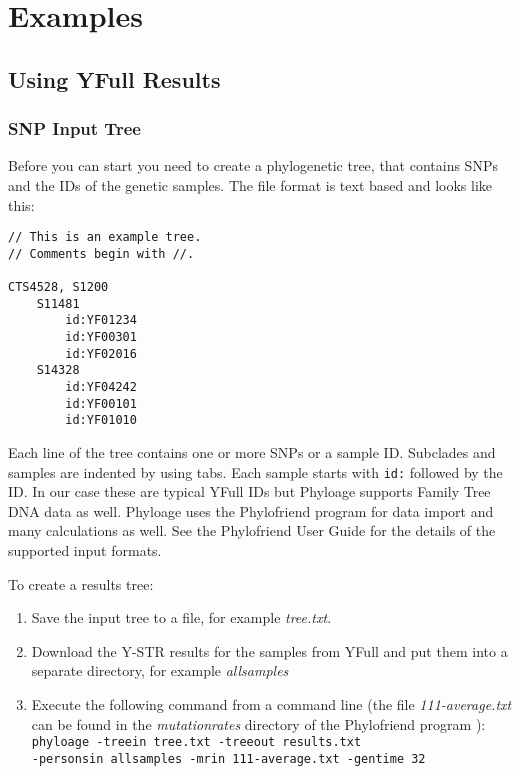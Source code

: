 \section{Examples}

\subsection{Using YFull Results}

\subsubsection*{SNP Input Tree}

Before you can start you need to create a phylogenetic tree,
that contains SNPs and the IDs of the genetic samples. The
file format is text based and looks like this:

\begin{verbatim}
// This is an example tree.
// Comments begin with //.

CTS4528, S1200
    S11481
        id:YF01234
        id:YF00301
        id:YF02016
    S14328
        id:YF04242
        id:YF00101
        id:YF01010
\end{verbatim}

Each line of the tree contains one or more SNPs or a sample
ID. Subclades and samples are indented by using tabs. Each
sample starts with \texttt{id:} followed by the ID. In our case
these are typical YFull IDs but Phyloage supports Family Tree
DNA data as well. Phyloage uses the Phylofriend
\cite{Phylofriend} program for data import and many
calculations as well. See the Phylofriend User Guide
\cite{PhylofriendUserGuide} for the details of the supported
input formats.

To create a results tree:

\begin{enumerate}
\item Save the input tree to a file, for example \emph{tree.txt}.
\item Download the Y-STR results for the samples from YFull
    and put them into a separate directory, for example
    \emph{allsamples}
\item Execute the following command from a command line
    (the file \emph{111-average.txt} can be found in the
    \emph{mutationrates} directory of the Phylofriend program
    \cite{Phylofriend}):\\
\texttt{phyloage -treein tree.txt -treeout results.txt\\
-personsin allsamples -mrin 111-average.txt -gentime 32}
\end{enumerate}

